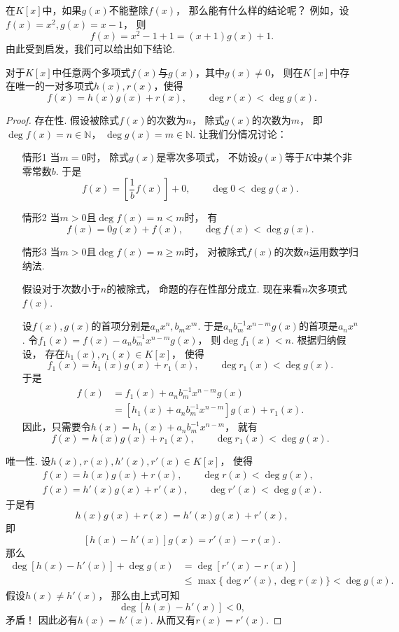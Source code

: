 在\(K[x]\)中，如果\(g(x)\)不能整除\(f(x)\)，
那么能有什么样的结论呢？
例如，设\(f(x)=x^2,
g(x)=x-1\)，
则\[
	f(x)=x^2-1+1=(x+1)g(x)+1.
\]
由此受到启发，我们可以给出如下结论.
\begin{theorem}\label{theorem:多项式.带余除法}
对于\(K[x]\)中任意两个多项式\(f(x)\)与\(g(x)\)，其中\(g(x)\neq0\)，
则在\(K[x]\)中存在唯一的一对多项式\(h(x),r(x)\)，使得\[
	f(x) = h(x) g(x) + r(x),
	\qquad
	\deg r(x) < \deg g(x).
\]
\begin{proof}
存在性.
假设被除式\(f(x)\)的次数为\(n\)，
除式\(g(x)\)的次数为\(m\)，
即\(\deg f(x)=n\in\mathbb{N}\)，
\(\deg g(x)=m\in\mathbb{N}\).
让我们分情况讨论：\begin{enumerate}
	\item[情形1]
	当\(m=0\)时，
	除式\(g(x)\)是零次多项式，
	不妨设\(g(x)\)等于\(K\)中某个非零常数\(b\).
	于是\[
		f(x) = \left[ \frac1b f(x) \right] + 0,
		\qquad
		\deg 0 < \deg g(x).
	\]

	\item[情形2]
	当\(m>0\)且\(\deg f(x) = n < m\)时，
	有\[
		f(x) = 0 g(x) + f(x), \qquad
		\deg f(x) < \deg g(x).
	\]

	\item[情形3]
	当\(m>0\)且\(\deg f(x) = n \geq m\)时，
	对被除式\(f(x)\)的次数\(n\)运用数学归纳法.

	假设对于次数小于\(n\)的被除式，
	命题的存在性部分成立.
	现在来看\(n\)次多项式\(f(x)\).

	设\(f(x),g(x)\)的首项分别是\(a_n x^n,b_m x^m\).
	于是\(a_n b_m^{-1} x^{n-m} g(x)\)的首项是\(a_n x^n\).
	令\(f_1(x) = f(x) - a_n b_m^{-1} x^{n-m} g(x)\)，
	则\(\deg f_1(x) < n\).
	根据归纳假设，
	存在\(h_1(x),r_1(x) \in K[x]\)，
	使得\[
		f_1(x) = h_1(x) g(x) + r_1(x), \qquad
		\deg r_1(x) < \deg g(x).
	\]
	于是\begin{align*}
		f(x)
		&= f_1(x) + a_n b_m^{-1} x^{n-m} g(x) \\
		&= [h_1(x) + a_n b_m^{-1} x^{n-m}] g(x) + r_1(x).
	\end{align*}
	因此，只需要令\(h(x) = h_1(x) + a_n b_m^{-1} x^{n-m}\)，
	就有\[
		f(x) = h(x) g(x) + r_1(x),
		\qquad
		\deg r_1(x) < \deg g(x).
	\]
\end{enumerate}

唯一性.
设\(h(x),r(x),h'(x),r'(x) \in K[x]\)，
使得\begin{gather*}
	f(x) = h(x) g(x) + r(x), \qquad \deg r(x) < \deg g(x), \\
	f(x) = h'(x) g(x) + r'(x), \qquad \deg r'(x) < \deg g(x).
\end{gather*}
于是有\[
	h(x) g(x) + r(x)
	= h'(x) g(x) + r'(x),
\]
即\[
	[h(x) - h'(x)] g(x) = r'(x) - r(x).
\]
那么\begin{align*}
	\deg[h(x) - h'(x)] + \deg g(x)
	&= \deg[r'(x) - r(x)] \\
	&\leq \max\{
		\deg r'(x),
		\deg r(x)
	\}
	< \deg g(x).
\end{align*}
假设\(h(x) \neq h'(x)\)，
那么由上式可知\[
	\deg[h(x) - h'(x)] < 0,
\]
矛盾！
因此必有\(h(x) = h'(x)\).
从而又有\(r(x) = r'(x)\).
\end{proof}
\end{theorem}

